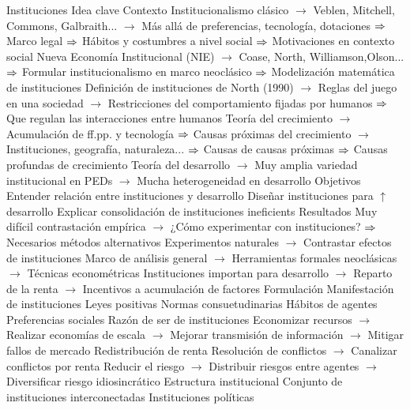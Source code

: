 \documentclass{nuevotema}
\begin{document}
\begin{esquemal}
		\2 Instituciones
			\3 Idea clave
				\4 Contexto
				\4[] Institucionalismo clásico
				\4[] $\to$ Veblen, Mitchell, Commons, Galbraith...
				\4[] $\to$ Más allá de preferencias, tecnología, dotaciones
				\4[] $\Rightarrow$ Marco legal
				\4[] $\Rightarrow$ Hábitos y costumbres a nivel social
				\4[] $\Rightarrow$ Motivaciones en contexto social
				\4[] Nueva Economía Institucional (NIE)
				\4[] $\to$ Coase, North, Williamson,Olson...
				\4[] $\Rightarrow$ Formular institucionalismo en marco neoclásico
				\4[] $\Rightarrow$ Modelización matemática de instituciones
				\4[] Definición de instituciones de North (1990)
				\4[] $\to$ Reglas del juego en una sociedad
				\4[] $\to$ Restricciones del comportamiento fijadas por humanos
				\4[] $\Rightarrow$ Que regulan las interacciones entre humanos
				\4[] Teoría del crecimiento
				\4[] $\to$ Acumulación de ff.pp. y tecnología
				\4[] $\Rightarrow$ Causas próximas del crecimiento
				\4[] $\to$ Instituciones, geografía, naturaleza...
				\4[] $\Rightarrow$ Causas de causas próximas
				\4[] $\Rightarrow$ Causas profundas de crecimiento
				\4[] Teoría del desarrollo
				\4[] $\to$ Muy amplia variedad institucional en PEDs
				\4[] $\to$ Mucha heterogeneidad en desarrollo
				\4 Objetivos
				\4[] Entender relación entre instituciones y desarrollo
				\4[] Diseñar instituciones para $\uparrow$ desarrollo
				\4[] Explicar consolidación de instituciones ineficients
				\4 Resultados
				\4[] Muy difícil contrastación empírica
				\4[] $\to$ ¿Cómo experimentar con instituciones?
				\4[] $\Rightarrow$ Necesarios métodos alternativos
				\4[] Experimentos naturales
				\4[] $\to$ Contrastar efectos de instituciones
				\4[] Marco de análisis general
				\4[] $\to$ Herramientas formales neoclásicas
				\4[] $\to$ Técnicas econométricas
				\4[] Instituciones importan para desarrollo
				\4[] $\to$ Reparto de la renta
				\4[] $\to$ Incentivos a acumulación de factores
			\3 Formulación
				\4 Manifestación de instituciones
				\4[] Leyes positivas
				\4[] Normas consuetudinarias
				\4[] Hábitos de agentes
				\4[] Preferencias sociales
				\4 Razón de ser de instituciones
				\4[] Economizar recursos
				\4[] $\to$ Realizar economías de escala
				\4[] $\to$ Mejorar transmisión de información
				\4[] $\to$ Mitigar fallos de mercado
				\4[] Redistribución de renta
				\4[] Resolución de conflictos
				\4[] $\to$ Canalizar conflictos por renta
				\4[] Reducir el riesgo
				\4[] $\to$ Distribuir riesgos entre agentes
				\4[] $\to$ Diversificar riesgo idiosincrático
				\4 Estructura institucional
				\4[] Conjunto de instituciones interconectadas
				\4 Instituciones políticas

\end{esquemal}
\end{document}
